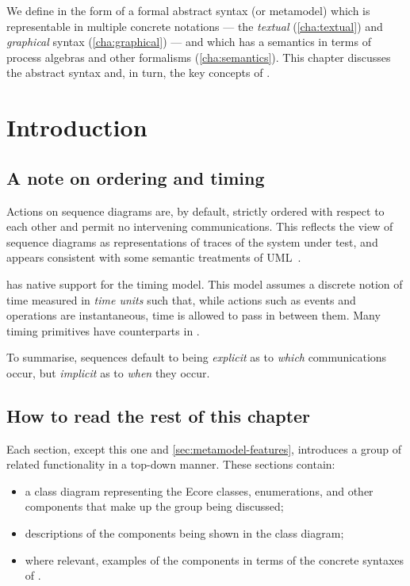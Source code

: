 

We define \langname{} in the form of a formal abstract syntax (or
metamodel) which is representable in multiple concrete notations ---
the \emph{textual} (\cref{cha:textual}) and \emph{graphical}
syntax (\cref{cha:graphical}) --- and which has a semantics in terms
of process algebras and other formalisms (\cref{cha:semantics}).  This
chapter discusses the abstract syntax and, in turn, the key concepts
of \langname.

\section{Introduction}\label{sec:metamodel-intro}

\subsection{A note on ordering and timing}\label{sec:metamodel-intro-ordering}

Actions on \langname{} sequence diagrams are, by default, strictly
ordered with respect to each other and permit no intervening
communications.  This reflects the view of sequence diagrams as
representations of traces of the system under test, and appears
consistent with some semantic treatments of UML~\cite{lima-semantics}.

\langname{} has native support for the \robochart{} timing model.
This model assumes a discrete notion of time measured in \emph{time
  units} such that, while actions such as events and operations are
instantaneous, time is allowed to pass in between them.  Many
\robochart{} timing primitives have counterparts in \langname.

To summarise, \langname{} sequences default to being \emph{explicit}
as to \emph{which} communications occur, but \emph{implicit} as to
\emph{when} they occur.

\subsection{How to read the rest of this chapter}\label{ssec:metamodel-intro-readme}

Each section, except this one and \cref{sec:metamodel-features},
introduces a group of related \langname{}
functionality in a top-down manner.  These sections contain:

\begin{itemize}
\item
	a class diagram representing the Ecore classes, enumerations, and other
	components that make up the group being discussed;
\item
	descriptions of the components being shown in the class diagram;
\item
	where relevant, examples of the components in terms of the concrete
	syntaxes of \langname.
\end{itemize}

